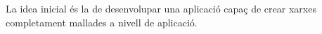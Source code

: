 La idea inicial és la de desenvolupar una aplicació capaç de crear xarxes completament mallades a nivell de aplicació.
